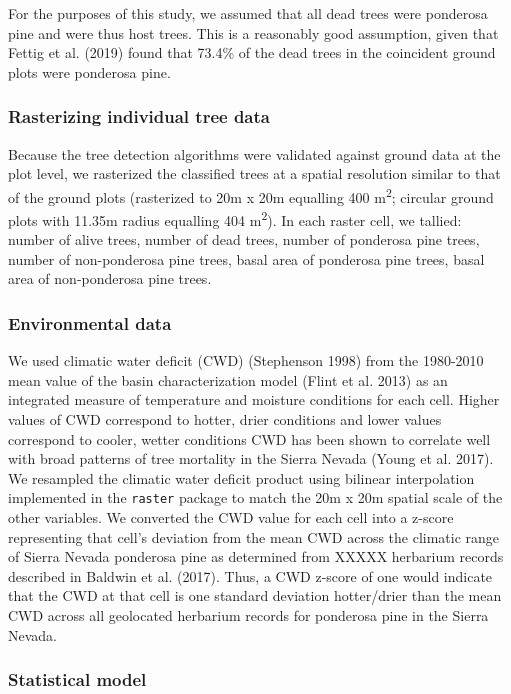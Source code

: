 \documentclass[]{article}
\begin{document}
For the purposes of this study, we assumed that all dead trees were
ponderosa pine and were thus host trees. This is a reasonably good
assumption, given that Fettig et al. (2019) found that 73.4\% of the
dead trees in the coincident ground plots were ponderosa pine.

\subsubsection{Rasterizing individual tree
data}\label{rasterizing-individual-tree-data}

Because the tree detection algorithms were validated against ground data
at the plot level, we rasterized the classified trees at a spatial
resolution similar to that of the ground plots (rasterized to 20m x 20m
equalling 400 m\textsuperscript{2}; circular ground plots with 11.35m
radius equalling 404 m\textsuperscript{2}). In each raster cell, we
tallied: number of alive trees, number of dead trees, number of
ponderosa pine trees, number of non-ponderosa pine trees, basal area of
ponderosa pine trees, basal area of non-ponderosa pine trees.

\subsubsection{Environmental data}\label{environmental-data}

We used climatic water deficit (CWD) (Stephenson 1998) from the
1980-2010 mean value of the basin characterization model (Flint et al.
2013) as an integrated measure of temperature and moisture conditions
for each cell. Higher values of CWD correspond to hotter, drier
conditions and lower values correspond to cooler, wetter conditions CWD
has been shown to correlate well with broad patterns of tree mortality
in the Sierra Nevada (Young et al. 2017). We resampled the climatic
water deficit product using bilinear interpolation implemented in the
\texttt{raster} package to match the 20m x 20m spatial scale of the
other variables. We converted the CWD value for each cell into a z-score
representing that cell's deviation from the mean CWD across the climatic
range of Sierra Nevada ponderosa pine as determined from XXXXX herbarium
records described in Baldwin et al. (2017). Thus, a CWD z-score of one
would indicate that the CWD at that cell is one standard deviation
hotter/drier than the mean CWD across all geolocated herbarium records
for ponderosa pine in the Sierra Nevada.

\subsubsection{Statistical model}\label{statistical-model}
\end{document}
